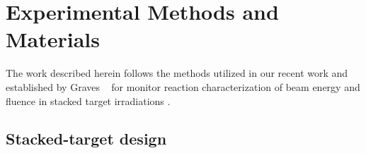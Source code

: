 \section{\label{sec:experimental_fe}Experimental Methods and Materials}


The work described herein follows the  methods utilized in our recent work and established by Graves \etal\ 
for monitor reaction characterization of beam energy and fluence in stacked target irradiations \cite{Voyles2018a,Graves2016}.
% 
% 
% 



\subsection{\label{sec:target_design_fe}Stacked-target design}



